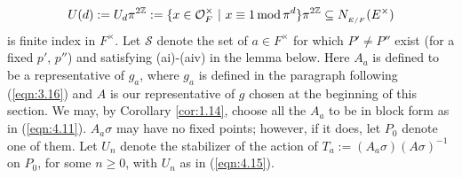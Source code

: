 \documentclass[12pt,letterpaper]{amsart}
\numberwithin{equation}{section}
\theoremstyle{definition}
\theoremstyle{plain}
\providecommand{\cal}{\mathcal}
\def\zzz{\mathbb{Z}}
\def\off{{\cal O}_F}
\begin{document}
\begin{equation}
\label{eqn:4.15}
U(d):=U_d\pi^{2\zzz}:=
\{x\in\off^{\times}\ |\ x\equiv 1 \, {\rm mod}\, \pi^d\}\pi^{2\zzz}
\subseteq N_{_{E/F}}(E^{\times})
\end{equation}
is finite index in $F^{\times}$. Let ${\cal S}$ denote the set of 
$a\in F^{\times}$ for which
$P'\not= P''$ exist (for a fixed $p'$, $p''$) and satisfying (ai)-(aiv) in the 
lemma below. Here $A_a$ is defined to be a representative of $g_a$, where 
$g_a$ is defined in the paragraph following (\ref{eqn:3.16}) and $A$ is our
representative of $g$ chosen at the beginning of this section. We may,
by Corollary \ref{cor:1.14}, choose all the $A_a$ to be in block form as in 
(\ref{eqn:4.11}).
$A_a\sigma$ may have no
fixed points; however, if it does, let $P_0$ denote one of them. Let
$U_n$ denote the stabilizer of the action of 
$T_a :=(A_a\sigma )(A\sigma )^{-1}$ on $P_0$, for some $n\geq 0$, with
$U_n$ as in (\ref{eqn:4.15}).
\end{document}
